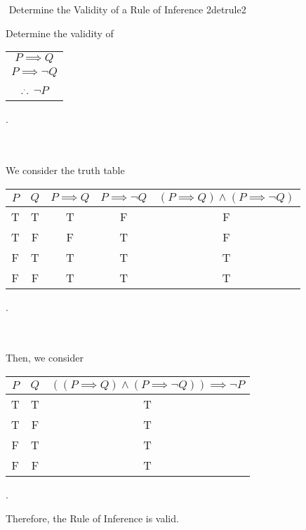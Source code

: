         \begin{exercise}{\Difficulty\,\,Determine the Validity of a Rule of Inference 2}{detrule2}
        
            Determine the validity of
            \begin{center}
            \begin{tabular}{c}
                \hline
                \(P\implies Q\) \\
                \(P\implies \neg Q\) \\
                \hline
                \(.^..\) \(\neg P\) \\
                \hline 
            \end{tabular}.
        \end{center}
        \vphantom
        \\
        \\
        We consider the truth table
        \begin{center}
            \begin{tabular}{c|c|c|c|c}
            \hline
                \(P\) & \(Q\) & \(P\implies Q\) & \(P\implies \neg Q\) & \((P\implies Q) \wedge (P \implies \neg Q)\) \\
                \hline
                T & T & T & F & F \\
                T & F & F & T & F \\
                F & T & T & T & T \\
                F & F & T & T & T \\
                \hline
            \end{tabular}.
        \end{center}
        \vphantom
        \\
        \\
        Then, we consider
        \begin{center}
            \begin{tabular}{c|c|c}
                \hline
                \(P\) & \(Q\) & \(((P\implies Q) \wedge (P \implies \neg Q))\implies \neg P\) \\
                \hline
                T & T & T \\
                T & F & T \\
                F & T & T \\
                F & F & T \\
                \hline
            \end{tabular}.
        \end{center}
        Therefore, the Rule of Inference is valid.
        \end{exercise}

